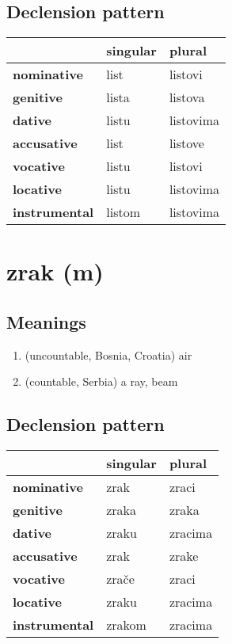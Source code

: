 \subsection*{Declension pattern}
\begin{tabularx}{\linewidth}{Xll}
\toprule
{} & singular &     plural \\
\midrule
\textbf{nominative  } &     list &    listovi \\
\textbf{genitive    } &    lista &    listova \\
\textbf{dative      } &    listu &  listovima \\
\textbf{accusative  } &     list &    listove \\
\textbf{vocative    } &    listu &    listovi \\
\textbf{locative    } &    listu &  listovima \\
\textbf{instrumental} &   listom &  listovima \\
\bottomrule
\end{tabularx}

\filbreak
\section{zrak (m)}
\subsection*{Meanings}
\begin{enumerate}
\item (uncountable, Bosnia, Croatia) air
\item (countable, Serbia) a ray, beam
\end{enumerate}
\subsection*{Declension pattern}
\begin{tabularx}{\linewidth}{Xll}
\toprule
{} & singular &   plural \\
\midrule
\textbf{nominative  } &     zrak &    zraci \\
\textbf{genitive    } &    zraka &    zraka \\
\textbf{dative      } &    zraku &  zracima \\
\textbf{accusative  } &     zrak &    zrake \\
\textbf{vocative    } &    zrače &    zraci \\
\textbf{locative    } &    zraku &  zracima \\
\textbf{instrumental} &   zrakom &  zracima \\
\bottomrule
\end{tabularx}

